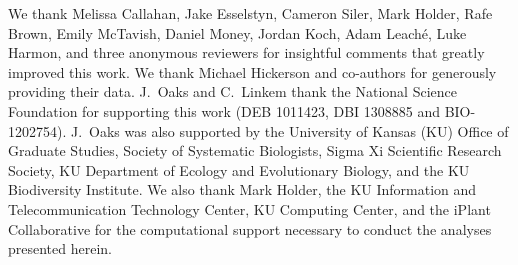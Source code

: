 We thank Melissa Callahan, Jake Esselstyn, Cameron Siler, Mark Holder, Rafe
Brown, Emily McTavish, Daniel Money, Jordan Koch, Adam Leach\'{e}, Luke Harmon,
and three anonymous reviewers for insightful comments that greatly improved
this work.
We thank Michael Hickerson and co-authors for generously providing their data.
J.\ Oaks and C.\ Linkem thank the National Science Foundation for supporting
this work (DEB 1011423, DBI 1308885 and BIO-1202754).
J.\ Oaks was also supported by the University of Kansas (KU) Office of Graduate
Studies, Society of Systematic Biologists, Sigma Xi Scientific Research
Society, KU Department of Ecology and Evolutionary Biology, and the KU
Biodiversity Institute.
We also thank Mark Holder, the KU Information and Telecommunication Technology
Center, KU Computing Center, and the iPlant Collaborative for the computational
support necessary to conduct the analyses presented herein.
